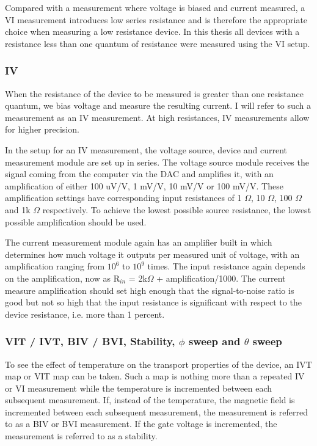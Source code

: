 Compared with a measurement where voltage is biased and current measured, a VI measurement introduces low series resistance and is therefore the appropriate choice when measuring a low resistance device. In this thesis all devices with a resistance less than one quantum of resistance were measured using the VI setup.\\ 




\subsubsection{IV}

When the resistance of the device to be measured is greater than one resistance quantum, we bias voltage and measure the resulting current. I will refer to such a measurement as an IV measurement. At high resistances, IV measurements allow for higher precision.

In the setup for an IV measurement, the voltage source, device and current measurement module are set up in series. The voltage source module receives the signal coming from the computer via the DAC and amplifies it, with an amplification of either 100 uV/V, 1 mV/V, 10 mV/V or 100 mV/V. These amplification settings have corresponding input resistances of 1 $\Omega$, 10 $\Omega$, 100 $\Omega$ and 1k $\Omega$ respectively. To achieve the lowest possible source resistance, the lowest possible amplification should be used.


The current measurement module again has an amplifier built in which determines how much voltage it outputs per measured unit of voltage, with an amplification ranging from $10^6$ to $10^9$ times. The input resistance again depends on the amplification, now as R$_{in}$ = 2k$\Omega$ + amplification/1000. The current measure amplification should set high enough that the signal-to-noise ratio is good but not so high that the input resistance is significant with respect to the device resistance, i.e. more than 1 percent.\\


\subsubsection{VIT / IVT, BIV / BVI, Stability, $\phi$ sweep and $\theta$ sweep}

To see the effect of temperature on the transport properties of the device, an IVT map or VIT map can be taken. Such a map is nothing more than a repeated IV or VI measurement while the temperature is incremented between each subsequent measurement. If, instead of the temperature, the magnetic field is incremented between each subsequent measurement, the measurement is referred to as a BIV or BVI measurement. If the gate voltage is incremented, the measurement is referred to as a stability.

